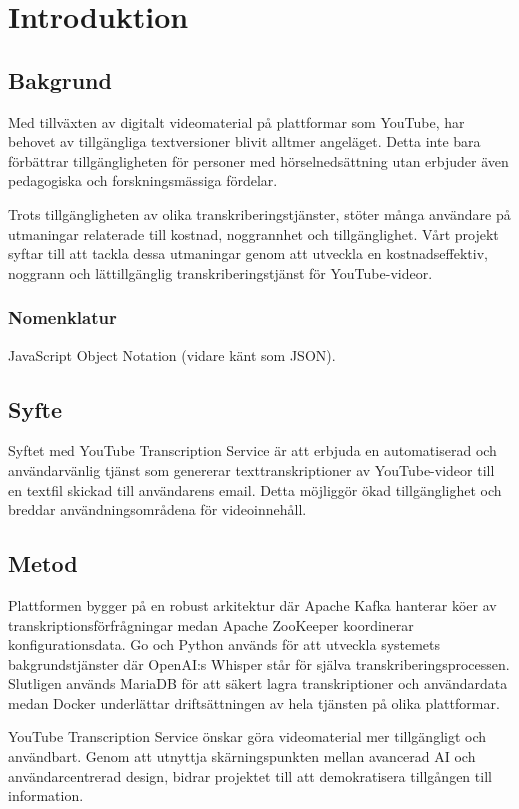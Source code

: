 \chapter{Introduktion}

\section{Bakgrund}
Med tillväxten av digitalt videomaterial på plattformar som YouTube, har behovet av tillgängliga textversioner blivit alltmer angeläget. Detta inte bara förbättrar tillgängligheten för personer med hörselnedsättning utan erbjuder även pedagogiska och forskningsmässiga fördelar.

Trots tillgängligheten av olika transkriberingstjänster, stöter många användare på utmaningar relaterade till kostnad, noggrannhet och tillgänglighet. Vårt projekt syftar till att tackla dessa utmaningar genom att utveckla en kostnadseffektiv, noggrann och lättillgänglig transkriberingstjänst för YouTube-videor.

\subsection{Nomenklatur}
JavaScript Object Notation (vidare känt som JSON).

\section{Syfte}
Syftet med YouTube Transcription Service är att erbjuda en automatiserad och användarvänlig tjänst som genererar texttranskriptioner av YouTube-videor till en textfil skickad till användarens email. Detta möjliggör ökad tillgänglighet och breddar användningsområdena för videoinnehåll.

\section{Metod}
Plattformen bygger på en robust arkitektur där Apache Kafka hanterar köer av transkriptionsförfrågningar medan Apache ZooKeeper koordinerar konfigurationsdata. Go och Python används för att utveckla systemets bakgrundstjänster där OpenAI:s Whisper står för själva transkriberingsprocessen. Slutligen används MariaDB för att säkert lagra transkriptioner och användardata medan Docker underlättar driftsättningen av hela tjänsten på olika plattformar.

YouTube Transcription Service önskar göra videomaterial mer tillgängligt och användbart. Genom att utnyttja skärningspunkten mellan avancerad AI och användarcentrerad design, bidrar projektet till att demokratisera tillgången till information.
